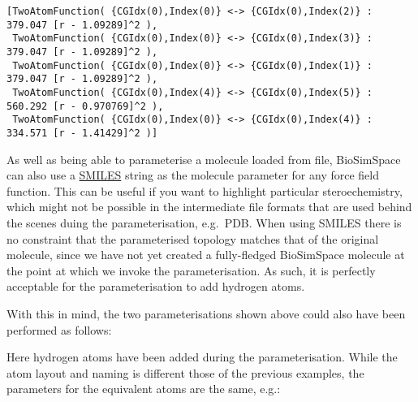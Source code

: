 \begin{verbatim}
[TwoAtomFunction( {CGIdx(0),Index(0)} <-> {CGIdx(0),Index(2)} : 379.047 [r - 1.09289]^2 ),
 TwoAtomFunction( {CGIdx(0),Index(0)} <-> {CGIdx(0),Index(3)} : 379.047 [r - 1.09289]^2 ),
 TwoAtomFunction( {CGIdx(0),Index(0)} <-> {CGIdx(0),Index(1)} : 379.047 [r - 1.09289]^2 ),
 TwoAtomFunction( {CGIdx(0),Index(4)} <-> {CGIdx(0),Index(5)} : 560.292 [r - 0.970769]^2 ),
 TwoAtomFunction( {CGIdx(0),Index(0)} <-> {CGIdx(0),Index(4)} : 334.571 [r - 1.41429]^2 )]
\end{verbatim}

As well as being able to parameterise a molecule loaded from file,
BioSimSpace can also use a
\href{https://en.wikipedia.org/wiki/Simplified_molecular-input_line-entry_system}{SMILES}
string as the molecule parameter for any force field function. This can
be useful if you want to highlight particular steroechemistry, which
might not be possible in the intermediate file formats that are used
behind the scenes duing the parameterisation, e.g.~PDB. When using
SMILES there is no constraint that the parameterised topology matches
that of the original molecule, since we have not yet created a
fully-fledged BioSimSpace molecule at the point at which we invoke the
parameterisation. As such, it is perfectly acceptable for the
parameterisation to add hydrogen atoms.

With this in mind, the two parameterisations shown above could also have
been performed as follows:

\begin{Shaded}
\begin{Highlighting}[]
\OperatorTok{=}
\OperatorTok{=}
\end{Highlighting}
\end{Shaded}

Here hydrogen atoms have been added during the parameterisation. While
the atom layout and naming is different those of the previous examples,
the parameters for the equivalent atoms are the same, e.g.:

\begin{Shaded}
\begin{Highlighting}[]
 
\end{Highlighting}
\end{Shaded}

